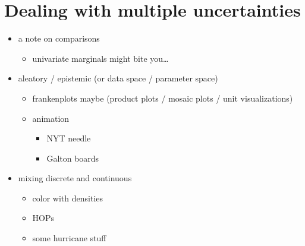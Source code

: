 \documentclass[]{book}
\providecommand{\tightlist}{%
  \setlength{\itemsep}{0pt}\setlength{\parskip}{0pt}}
\theoremstyle{definition}
\theoremstyle{definition}
\theoremstyle{definition}
\theoremstyle{remark}
\begin{document}
\chapter{Dealing with multiple uncertainties}\label{ch-multiple}

\begin{itemize}
\tightlist
\item
  a note on comparisons

  \begin{itemize}
  \tightlist
  \item
    univariate marginals might bite you\ldots{}
  \end{itemize}
\item
  aleatory / epistemic (or data space / parameter space)

  \begin{itemize}
  \tightlist
  \item
    frankenplots maybe (product plots / mosaic plots / unit
    visualizations)
  \item
    animation

    \begin{itemize}
    \tightlist
    \item
      NYT needle
    \item
      Galton boards
    \end{itemize}
  \end{itemize}
\item
  mixing discrete and continuous

  \begin{itemize}
  \tightlist
  \item
    color with densities
  \item
    HOPs
  \item
    some hurricane stuff
  \end{itemize}
\end{itemize}


\end{document}
